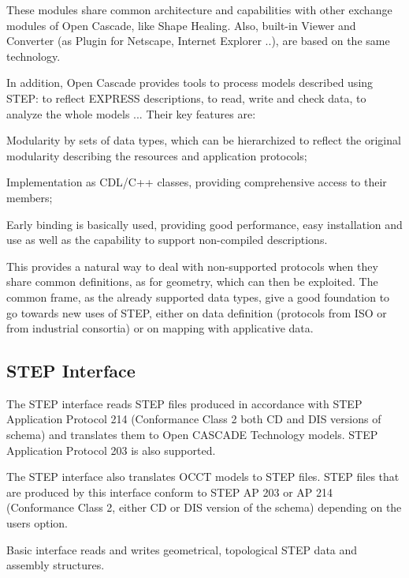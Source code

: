 These modules share common architecture and capabilities with other exchange modules of Open Cascade, like Shape Healing. Also, built-\/in Viewer and Converter (as Plugin for Netscape, Internet Explorer ..), are based on the same technology.

In addition, Open Cascade provides tools to process models described using S\+T\+EP\+: to reflect E\+X\+P\+R\+E\+SS descriptions, to read, write and check data, to analyze the whole models ... Their key features are\+:


\begin{DoxyItemize}
\item Modularity by sets of data types, which can be hierarchized to reflect the original modularity describing the resources and application protocols;
\item Implementation as C\+D\+L/\+C++ classes, providing comprehensive access to their members;
\item Early binding is basically used, providing good performance, easy installation and use as well as the capability to support non-\/compiled descriptions.
\end{DoxyItemize}

This provides a natural way to deal with non-\/supported protocols when they share common definitions, as for geometry, which can then be exploited. The common frame, as the already supported data types, give a good foundation to go towards new uses of S\+T\+EP, either on data definition (protocols from I\+SO or from industrial consortia) or on mapping with applicative data.\hypertarget{occt_user_guides__step_occt_step_1_2}{}\subsection{S\+T\+E\+P Interface}\label{occt_user_guides__step_occt_step_1_2}
The S\+T\+EP interface reads S\+T\+EP files produced in accordance with S\+T\+EP Application Protocol 214 (Conformance Class 2 both CD and D\+IS versions of schema) and translates them to Open C\+A\+S\+C\+A\+DE Technology models. S\+T\+EP Application Protocol 203 is also supported.

The S\+T\+EP interface also translates O\+C\+CT models to S\+T\+EP files. S\+T\+EP files that are produced by this interface conform to S\+T\+EP AP 203 or AP 214 (Conformance Class 2, either CD or D\+IS version of the schema) depending on the user\textquotesingle{}s option.

Basic interface reads and writes geometrical, topological S\+T\+EP data and assembly structures.

